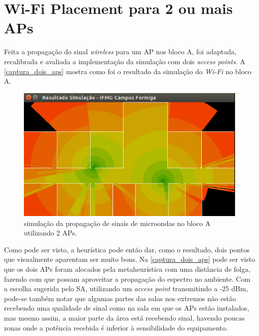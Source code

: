 \documentclass[
	12pt,				%
	openright,			%
	twoside,			%
	a4paper,			%
	english,			%
	french,				%
	spanish,			%
	brazil				%
	]{abntex2}
\begin{document}
\newpage

\section[Wi-Fi Placement para 2 ou mais APs]{Wi-Fi Placement para 2 ou mais APs}

Feita a propagação do sinal \textit{wireless} para um AP nos bloco A, foi adaptada, recalibrada e avaliada a implementação da simulação com dois \textit{access points}. A  \autoref{captura_dois_aps} mostra como foi o resultado da simulação do \textit{Wi-Fi} no bloco A.

\begin{figure}[ht]
	\caption{\label{captura_dois_aps}simulação da propagação de sinais de microondas no bloco A utilizando 2 APs.
	}
	\begin{center}
		\includegraphics[scale=0.6]{images/captura-2-aps-2.jpg}
	\end{center}
\end{figure}

Como pode ser visto, a heurística pode então dar, como o resultado, dois pontos que visualmente aparentam ser muito bons. Na \autoref{captura_dois_aps} pode ser visto que os dois APs foram alocados pela metaheurística com uma distância de folga, fazendo com que possam aproveitar a propagação do espectro no ambiente. Com a escolha sugerida pelo SA, utilizando um \textit{access point} transmitindo a -25 dBm, pode-se também notar que algumas partes das salas nos extremos não estão recebendo uma qualidade de sinal como na sala em que os APs estão instalados, mas mesmo assim, a maior parte da área está recebendo sinal, havendo poucas zonas onde a potência recebida é inferior à sensibilidade do equipamento.
\end{document}
